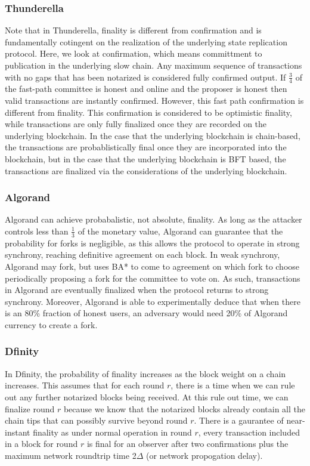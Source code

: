 \documentclass[10pt,journal,compsoc]{IEEEtran}
\begin{document}
\subsubsection{Thunderella} Note that in Thunderella, finality is different from confirmation and is fundamentally cotingent on the realization of the underlying state replication protocol. Here, we look at confirmation, which means committment to publication in the underlying slow chain. Any maximum sequence of transactions with no gaps that has been notarized is considered fully confirmed output. If \(\frac{3}{4}\) of the fast-path committee is honest and online and the proposer is honest then valid transactions are instantly confirmed. However, this fast path confirmation is different from finality. This confirmation is considered to be optimistic finality, while transactions are only fully finalized once they are recorded on the underlying blockchain. In the case that the underlying blockchain is chain-based, the transactions are probablistically final once they are incorporated into the blockchain, but in the case that the underlying blockchain is BFT based, the transactions are finalized via the considerations of the underlying blockchain.

\subsubsection{Algorand} Algorand can achieve probabalistic, not absolute, finality. As long as the attacker controls less than \(\frac{1}{3}\) of the monetary value, Algorand can guarantee that the probability for forks is negligible, as this allows the protocol to operate in strong synchrony, reaching definitive agreement on each block. In weak synchrony, Algorand may fork, but uses BA* to come to agreement on which fork to choose periodically proposing a fork for the committee to vote on. As such, transactions in Algorand are eventually finalized when the protocol returns to strong synchrony. Moreover, Algorand is able to experimentally deduce that when there is an 80\% fraction of honest users, an adversary would need 20\% of Algorand currency to create a fork.

\subsubsection{Dfinity}
In Dfinity, the probability of finality increases as the block weight on a chain increases. This assumes that for each round $r$, there is a time when we can rule out any further notarized blocks being received. At this rule out time, we can finalize round $r$ because we know that the notarized blocks already contain all the chain tips that can possibly survive beyond round $r$. There is a gaurantee of near-instant finality as under normal operation in round $r$, every transaction included in a block for round $r$ is final for an observer after two confirmations plus the maximum network roundtrip time 2$\Delta$ (or network propogation delay).  
\end{document}
